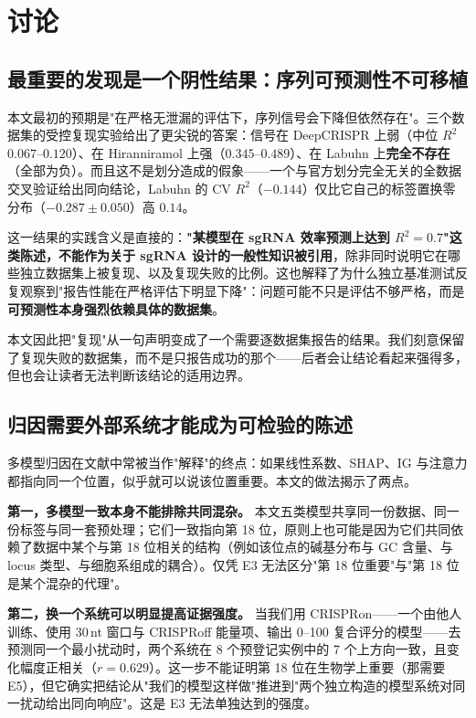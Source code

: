 \section{讨论}
\label{sec:discussion}

\subsection{最重要的发现是一个阴性结果：序列可预测性不可移植}

本文最初的预期是"在严格无泄漏的评估下，序列信号会下降但依然存在"。三个数据集的受控复现实验给出了更尖锐的答案：信号在 DeepCRISPR 上弱（中位 $R^{2}$ $0.067$--$0.120$）、在 Hiranniramol 上强（$0.345$--$0.489$）、在 Labuhn 上\textbf{完全不存在}（全部为负）。而且这不是划分造成的假象——一个与官方划分完全无关的全数据交叉验证给出同向结论，Labuhn 的 CV $R^{2}$（$-0.144$）仅比它自己的标签置换零分布（$-0.287\pm0.050$）高 $0.14$。

这一结果的实践含义是直接的：\textbf{"某模型在 sgRNA 效率预测上达到 $R^{2}=0.7$"这类陈述，不能作为关于 sgRNA 设计的一般性知识被引用}，除非同时说明它在哪些独立数据集上被复现、以及复现失败的比例。这也解释了为什么独立基准测试反复观察到"报告性能在严格评估下明显下降"\citep{Zhang2023BriefBioinform,Konstantakos2022NAR}：问题可能不只是评估不够严格，而是\textbf{可预测性本身强烈依赖具体的数据集}。

本文因此把"复现"从一句声明变成了一个需要逐数据集报告的结果。我们刻意保留了复现失败的数据集，而不是只报告成功的那个——后者会让结论看起来强得多，但也会让读者无法判断该结论的适用边界。

\subsection{归因需要外部系统才能成为可检验的陈述}

多模型归因在文献中常被当作"解释"的终点：如果线性系数、SHAP、IG 与注意力都指向同一个位置，似乎就可以说该位置重要。本文的做法揭示了两点。

\textbf{第一，多模型一致本身不能排除共同混杂。} 本文五类模型共享同一份数据、同一份标签与同一套预处理；它们一致指向第 18 位，原则上也可能是因为它们共同依赖了数据中某个与第 18 位相关的结构（例如该位点的碱基分布与 GC 含量、与 locus 类型、与细胞系组成的耦合）。仅凭 E3 无法区分"第 18 位重要"与"第 18 位是某个混杂的代理"。

\textbf{第二，换一个系统可以明显提高证据强度。} 当我们用 CRISPRon——一个由他人训练、使用 30\,nt 窗口与 CRISPRoff 能量项、输出 0--100 复合评分的模型——去预测同一个最小扰动时，两个系统在 8 个预登记实例中的 7 个上方向一致，且变化幅度正相关（$r=0.629$）。这一步不能证明第 18 位在生物学上重要（那需要 E5），但它确实把结论从"我们的模型这样做"推进到"两个独立构造的模型系统对同一扰动给出同向响应"。这是 E3 无法单独达到的强度。

